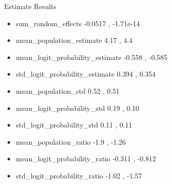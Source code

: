\documentclass{beamer}
\begin{document}
\begin{frame}{Estimate Results}
\begin{itemize}

\item
sum\_random\_effects
\hspace{4.9em} -0.0517 , -1.71e-14
\pause

\item
mean\_population\_estimate
\hspace{2.5em} 4.17 , 4.4
\pause

\item
mean\_logit\_probability\_estimate
\hspace{0.0em} -0.558 , -0.585
\pause

\item
std\_logit\_probability\_estimate
\hspace{1.3em} 0.394 , 0.354
\pause

\item
mean\_population\_std
\hspace{4.7em} 0.52 , 0.51
\pause

\item
mean\_logit\_probability\_std
\hspace{2.5em} 0.19 , 0.10
\pause

\item
std\_logit\_probability\_std
\hspace{3.5em} 0.11 , 0.11
\pause

\item
mean\_population\_ratio
\hspace{3.7em} -1.9 , -1.26
\pause

\item
mean\_logit\_probability\_ratio
\hspace{1.5em} -0.311 , -0.812
\pause

\item
std\_logit\_probability\_ratio
\hspace{2.5em} -1.02 , -1.57
\pause


\end{itemize}
\end{frame}
\end{document}

